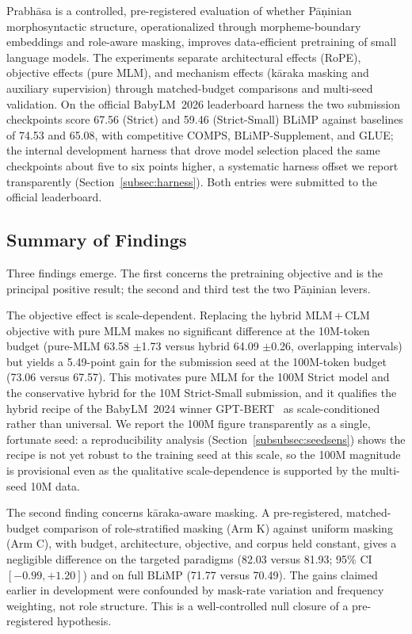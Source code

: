 
Prabhāsa is a controlled, pre-registered evaluation of whether Pāṇinian morphosyntactic structure, operationalized through morpheme-boundary embeddings and role-aware masking, improves data-efficient pretraining of small language models. The experiments separate architectural effects (RoPE), objective effects (pure MLM), and mechanism effects (kāraka masking and auxiliary supervision) through matched-budget comparisons and multi-seed validation. On the official BabyLM~2026 leaderboard harness the two submission checkpoints score 67.56 (Strict) and 59.46 (Strict-Small) BLiMP against baselines of 74.53 and 65.08, with competitive COMPS, BLiMP-Supplement, and GLUE; the internal development harness that drove model selection placed the same checkpoints about five to six points higher, a systematic harness offset we report transparently (Section~\ref{subsec:harness}). Both entries were submitted to the official leaderboard.

\subsection{Summary of Findings}

Three findings emerge. The first concerns the pretraining objective and is the principal positive result; the second and third test the two Pāṇinian levers.

The objective effect is scale-dependent. Replacing the hybrid MLM\,+\,CLM objective with pure MLM makes no significant difference at the 10M-token budget (pure-MLM 63.58 $\pm$1.73 versus hybrid 64.09 $\pm$0.26, overlapping intervals) but yields a 5.49-point gain for the submission seed at the 100M-token budget (73.06 versus 67.57). This motivates pure MLM for the 100M Strict model and the conservative hybrid for the 10M Strict-Small submission, and it qualifies the hybrid recipe of the BabyLM~2024 winner GPT-BERT~\cite{CharpentierSamuel2024} as scale-conditioned rather than universal. We report the 100M figure transparently as a single, fortunate seed: a reproducibility analysis (Section~\ref{subsubsec:seedsens}) shows the recipe is not yet robust to the training seed at this scale, so the 100M magnitude is provisional even as the qualitative scale-dependence is supported by the multi-seed 10M data.

The second finding concerns kāraka-aware masking. A pre-registered, matched-budget comparison of role-stratified masking (Arm K) against uniform masking (Arm C), with budget, architecture, objective, and corpus held constant, gives a negligible difference on the targeted paradigms (82.03 versus 81.93; 95\% CI $[-0.99, +1.20]$) and on full BLiMP (71.77 versus 70.49). The gains claimed earlier in development were confounded by mask-rate variation and frequency weighting, not role structure. This is a well-controlled null closure of a pre-registered hypothesis.

